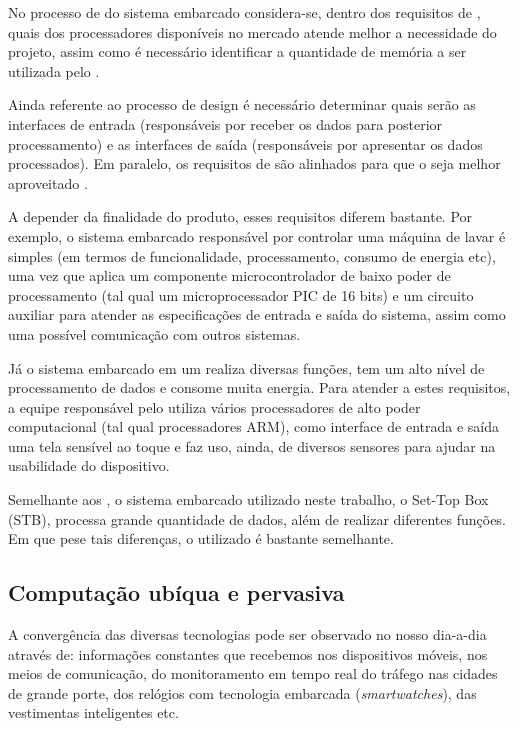 No processo de \design[] do sistema embarcado considera-se, dentro dos
requisitos de \hardware, quais dos processadores disponíveis no mercado atende
melhor a necessidade do projeto, assim como é necessário identificar a
quantidade de memória a ser utilizada pelo \software[]. 

Ainda referente ao processo de design é necessário determinar quais serão as
interfaces de entrada (responsáveis por receber os dados para posterior
processamento) e as interfaces de saída (responsáveis por apresentar os dados
processados). Em paralelo, os requisitos de \software[] são alinhados para que o
\hardware[] seja melhor aproveitado \cite{wolf2012computers}.

A depender da finalidade do produto, esses requisitos diferem bastante. Por
exemplo, o sistema embarcado responsável por controlar uma máquina de lavar é
simples (em termos de funcionalidade, processamento, consumo de energia etc),
uma vez que aplica um componente microcontrolador de baixo poder de
processamento (tal qual um microprocessador PIC de 16 bits) e um circuito
auxiliar para atender as especificações de entrada e saída do sistema, assim
como uma possível comunicação com outros sistemas.

Já o sistema embarcado em um \smartphone[] realiza diversas funções, tem um
alto nível de processamento de dados e consome muita energia. Para atender a
estes requisitos, a equipe responsável pelo \design[] utiliza vários
processadores de alto poder computacional (tal qual processadores ARM), como
interface de entrada e saída uma tela sensível ao toque e faz uso, ainda, de
diversos sensores para ajudar na usabilidade do dispositivo.

Semelhante aos \smartphones, o sistema embarcado utilizado neste trabalho, o
Set-Top Box (STB), processa grande quantidade de dados, além de realizar
diferentes funções. Em que pese tais diferenças, o \hardware[] utilizado é
bastante semelhante.

\subsection{Computação ubíqua e pervasiva}\label{subsec:computacao}

A convergência das diversas tecnologias pode ser observado no nosso dia-a-dia
através de: informações constantes que recebemos nos dispositivos móveis, nos
meios de comunicação, do monitoramento em tempo real do tráfego nas cidades de
grande porte, dos relógios com tecnologia embarcada (\textit{smartwatches}), das
vestimentas inteligentes etc.

